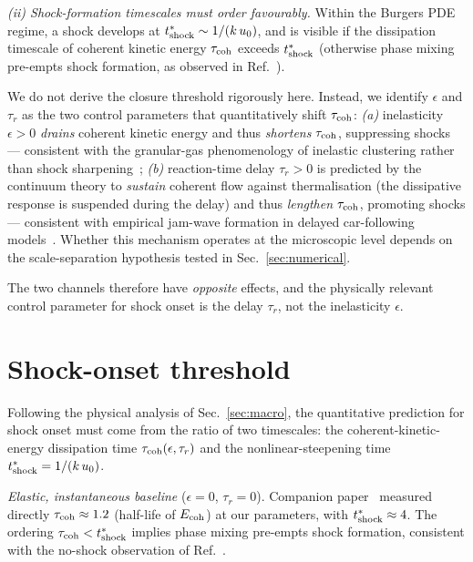 \documentclass[aps,pre,twocolumn,superscriptaddress,longbibliography,floatfix]{revtex4-2}
\begin{document}
\emph{(ii) Shock-formation timescales must order favourably.}
Within the Burgers PDE regime, a shock develops at
$t^*_{\rm shock}\sim 1/(k\,u_0)$, and is visible if the
dissipation timescale of coherent kinetic energy
$\tau_{\rm coh}$ exceeds $t^*_{\rm shock}$ (otherwise
phase mixing pre-empts shock formation, as observed in
Ref.~\cite{PaperIII}).

We do not derive the closure threshold rigorously here.
Instead, we identify $\epsilon$ and $\tau_r$ as the two control
parameters that quantitatively shift $\tau_{\rm coh}$:
\emph{(a)} inelasticity $\epsilon>0$ \emph{drains} coherent
kinetic energy and thus \emph{shortens} $\tau_{\rm coh}$,
suppressing shocks --- consistent with the granular-gas
phenomenology of inelastic clustering rather than shock
sharpening~\cite{BrilliantovPoschel};
\emph{(b)} reaction-time delay $\tau_r>0$ is predicted by
the continuum theory to \emph{sustain} coherent flow against
thermalisation (the dissipative response is suspended during
the delay) and thus \emph{lengthen} $\tau_{\rm coh}$,
promoting shocks --- consistent with empirical jam-wave
formation in delayed car-following
models~\cite{Bando1995,Treiber2000,Komatsu1995}. Whether
this mechanism operates at the microscopic level depends on
the scale-separation hypothesis tested in
Sec.~\ref{sec:numerical}.

The two channels therefore have \emph{opposite} effects, and
the physically relevant control parameter for shock onset is
the delay $\tau_r$, not the inelasticity $\epsilon$.

\section{Shock-onset threshold}\label{sec:onset}

Following the physical analysis of Sec.~\ref{sec:macro}, the
quantitative prediction for shock onset must come from the
ratio of two timescales: the coherent-kinetic-energy
dissipation time $\tau_{\rm coh}(\epsilon,\tau_r)$ and the
nonlinear-steepening time
$t^*_{\rm shock}=1/(k\,u_0)$.

\emph{Elastic, instantaneous baseline} ($\epsilon=0$,
$\tau_r=0$).
Companion paper~\cite{PaperIII} measured directly
$\tau_{\rm coh}\approx 1.2$ (half-life of $E_{\rm coh}$) at our
parameters, with $t^*_{\rm shock}\approx 4$. The ordering
$\tau_{\rm coh}<t^*_{\rm shock}$ implies phase mixing
pre-empts shock formation, consistent with the no-shock
observation of Ref.~\cite{PaperIII}.
\end{document}
